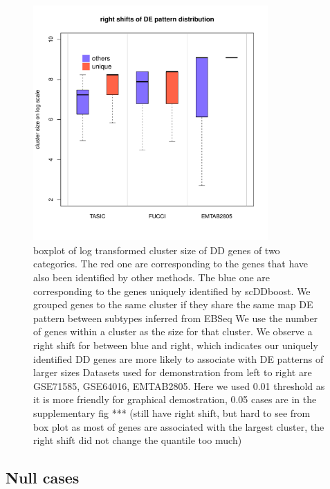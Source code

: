 \documentclass[aoas,preprint]{imsart}
\begin{document}
\begin{figure}[H]
\includegraphics[width = 0.8\textwidth]{Figs/clussz.pdf}
 \caption{  boxplot of log transformed cluster size of DD genes of two categories. 
 The red one are corresponding to the genes that have also been identified by other methods.
 The blue one are corresponding to the genes uniquely identified by scDDboost. 
 We grouped genes to the same cluster if they share the same  map DE pattern between subtypes inferred from EBSeq
 We use the number of genes within a cluster as the size for that cluster. 
 We observe a right shift for between blue and right, which indicates our uniquely identified DD genes are more likely to associate with DE patterns of larger sizes
 Datasets used for demonstration from left to right are GSE71585, GSE64016, EMTAB2805. 
 Here we used 0.01 threshold as it is more friendly for graphical demostration, 0.05 cases are in the supplementary fig *** (still have right shift, but hard to see from box plot as most of genes are associated with the largest cluster, the right shift did not change the quantile too much) }
  \label{fig:7}
\end{figure}




\subsection{Null cases}
\end{document}
